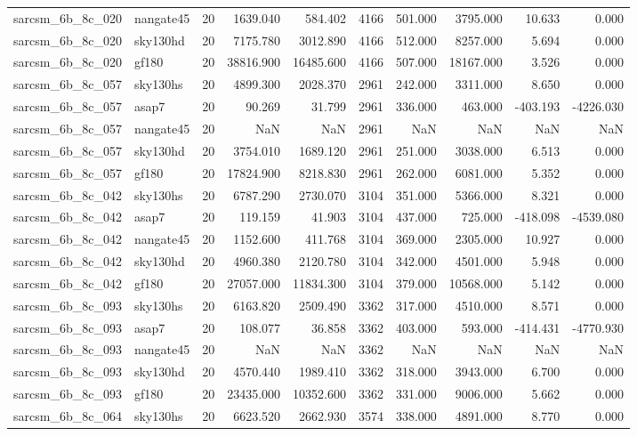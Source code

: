 \documentclass{article}
\begin{document}
\begin{longtable}{llrrrrrrrr}
sarcsm\_6b\_8c\_020 & nangate45 & 20 & 1639.040 & 584.402 & 4166 & 501.000 & 3795.000 & 10.633 & 0.000 \\
sarcsm\_6b\_8c\_020 & sky130hd & 20 & 7175.780 & 3012.890 & 4166 & 512.000 & 8257.000 & 5.694 & 0.000 \\
sarcsm\_6b\_8c\_020 & gf180 & 20 & 38816.900 & 16485.600 & 4166 & 507.000 & 18167.000 & 3.526 & 0.000 \\
sarcsm\_6b\_8c\_057 & sky130hs & 20 & 4899.300 & 2028.370 & 2961 & 242.000 & 3311.000 & 8.650 & 0.000 \\
sarcsm\_6b\_8c\_057 & asap7 & 20 & 90.269 & 31.799 & 2961 & 336.000 & 463.000 & -403.193 & -4226.030 \\
sarcsm\_6b\_8c\_057 & nangate45 & 20 & NaN & NaN & 2961 & NaN & NaN & NaN & NaN \\
sarcsm\_6b\_8c\_057 & sky130hd & 20 & 3754.010 & 1689.120 & 2961 & 251.000 & 3038.000 & 6.513 & 0.000 \\
sarcsm\_6b\_8c\_057 & gf180 & 20 & 17824.900 & 8218.830 & 2961 & 262.000 & 6081.000 & 5.352 & 0.000 \\
sarcsm\_6b\_8c\_042 & sky130hs & 20 & 6787.290 & 2730.070 & 3104 & 351.000 & 5366.000 & 8.321 & 0.000 \\
sarcsm\_6b\_8c\_042 & asap7 & 20 & 119.159 & 41.903 & 3104 & 437.000 & 725.000 & -418.098 & -4539.080 \\
sarcsm\_6b\_8c\_042 & nangate45 & 20 & 1152.600 & 411.768 & 3104 & 369.000 & 2305.000 & 10.927 & 0.000 \\
sarcsm\_6b\_8c\_042 & sky130hd & 20 & 4960.380 & 2120.780 & 3104 & 342.000 & 4501.000 & 5.948 & 0.000 \\
sarcsm\_6b\_8c\_042 & gf180 & 20 & 27057.000 & 11834.300 & 3104 & 379.000 & 10568.000 & 5.142 & 0.000 \\
sarcsm\_6b\_8c\_093 & sky130hs & 20 & 6163.820 & 2509.490 & 3362 & 317.000 & 4510.000 & 8.571 & 0.000 \\
sarcsm\_6b\_8c\_093 & asap7 & 20 & 108.077 & 36.858 & 3362 & 403.000 & 593.000 & -414.431 & -4770.930 \\
sarcsm\_6b\_8c\_093 & nangate45 & 20 & NaN & NaN & 3362 & NaN & NaN & NaN & NaN \\
sarcsm\_6b\_8c\_093 & sky130hd & 20 & 4570.440 & 1989.410 & 3362 & 318.000 & 3943.000 & 6.700 & 0.000 \\
sarcsm\_6b\_8c\_093 & gf180 & 20 & 23435.000 & 10352.600 & 3362 & 331.000 & 9006.000 & 5.662 & 0.000 \\
sarcsm\_6b\_8c\_064 & sky130hs & 20 & 6623.520 & 2662.930 & 3574 & 338.000 & 4891.000 & 8.770 & 0.000 \\

\end{longtable}
\end{document}
